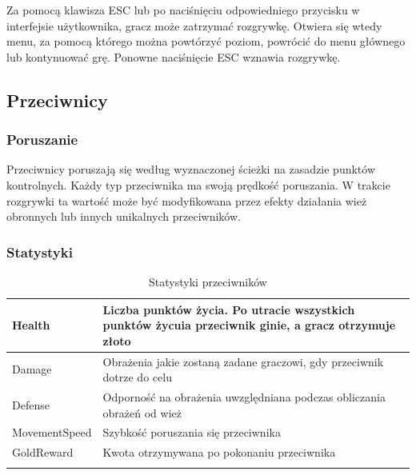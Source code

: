 \documentclass[a4paper,12pt, twoside, titlepage]{article}
\begin{document}
Za pomocą klawisza ESC lub po naciśnięciu odpowiedniego przycisku w interfejsie użytkownika, gracz może zatrzymać rozgrywkę. Otwiera się wtedy menu, za pomocą którego można powtórzyć poziom, powrócić do menu głównego lub kontynuować grę. Ponowne naciśnięcie ESC wznawia rozgrywkę.


\subsection{Przeciwnicy}
\subsubsection{Poruszanie}
Przeciwnicy poruszają się według wyznaczonej ścieżki na zasadzie punktów kontrolnych. Każdy typ przeciwnika ma swoją prędkość poruszania. W trakcie rozgrywki ta wartość może być modyfikowana przez efekty działania wież obronnych lub innych unikalnych przeciwników.
\subsubsection{Statystyki}
\begin{center}
\begin{longtable}{| p{} | p{} |} 
	\hline
	Health
	& Liczba punktów życia. Po utracie wszystkich punktów życuia przeciwnik ginie, a gracz otrzymuje złoto \\
	\hline
	Damage
	& Obrażenia jakie zostaną zadane graczowi, gdy przeciwnik dotrze do celu \\ 
	\hline 
	Defense
	& Odporność na obrażenia uwzględniana podczas obliczania obrażeń od wież \\ 
	\hline
	MovementSpeed
	& Szybkość poruszania się przeciwnika \\ 
	\hline
	GoldReward
	& Kwota otrzymywana po pokonaniu przeciwnika \\ 
	\hline

	\caption{Statystyki przeciwników}	
\end{longtable}
\end{center}

\newpage
\end{document}
